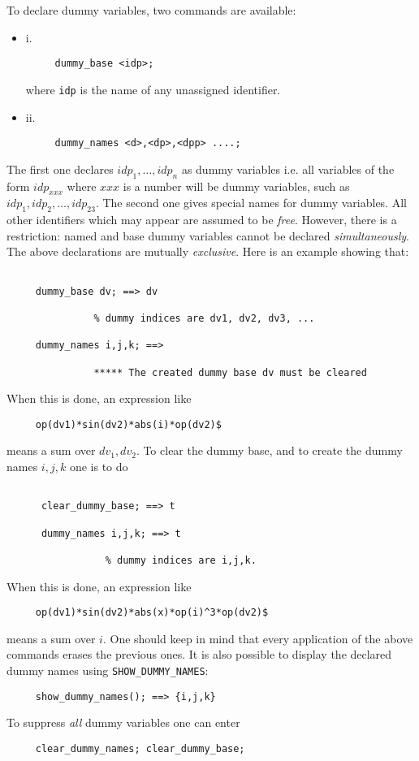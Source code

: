 To declare dummy variables, two commands are available:
\begin{itemize}
\item{i.}
\begin{verbatim}
     dummy_base <idp>;
\end{verbatim}
where {\tt idp} is the name of any unassigned identifier.
\item{ii.}
\begin{verbatim}
     dummy_names <d>,<dp>,<dpp> ....;
\end{verbatim}
\end{itemize}
The first one  declares $ idp_1,\ldots, idp_n$ as dummy variables i.e.
all variables of the form $idp_{xxx}$ where $xxx$ is a number
will be dummy variables, such as $idp_1, idp_2,\ldots, idp_{23}$.
The second one gives special names for dummy variables.
All other identifiers which may appear are assumed to be {\em free}.
However, there is a restriction: named and base dummy variables 
cannot be declared {\em simultaneously}. The above declarations are 
mutually {\em exclusive}. 
Here is an example  showing that:
\begin{verbatim}

     dummy_base dv; ==> dv

               % dummy indices are dv1, dv2, dv3, ...

     dummy_names i,j,k; ==> 
                 
               ***** The created dummy base dv must be cleared
\end{verbatim}
When this is done, an expression like 
\begin{verbatim}
     op(dv1)*sin(dv2)*abs(i)*op(dv2)$
\end{verbatim}
means a sum over $dv_1,dv_2$.
To clear the dummy base, and to create the dummy names $i,j,k$ one is 
to do
\begin{verbatim}

      clear_dummy_base; ==> t

      dummy_names i,j,k; ==> t
                
                 % dummy indices are i,j,k.
\end{verbatim}
When this is done, an expression like
\begin{verbatim}
     op(dv1)*sin(dv2)*abs(x)*op(i)^3*op(dv2)$
\end{verbatim}
means a sum over $i$.
One should keep in mind that every application of the above commands 
erases the previous ones. 
It is also possible to display the declared dummy names using 
{\tt SHOW\_DUMMY\_NAMES}:
\begin{verbatim}
     show_dummy_names(); ==> {i,j,k}
\end{verbatim}
To suppress {\em all} dummy variables one can enter
\begin{verbatim}
     clear_dummy_names; clear_dummy_base;
\end{verbatim}

